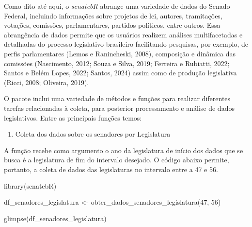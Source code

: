 \documentclass{article}
\newenvironment{Shaded}{\begin{snugshade}}{\end{snugshade}}
\newcommand{\DecValTok}[1]{\textcolor[rgb]{0.00,0.00,0.81}{#1}}
\newcommand{\FunctionTok}[1]{\textcolor[rgb]{0.00,0.00,0.00}{#1}}
\newcommand{\NormalTok}[1]{#1}
\newcommand{\OtherTok}[1]{\textcolor[rgb]{0.56,0.35,0.01}{#1}}
\providecommand{\tightlist}{%
  \setlength{\itemsep}{0pt}\setlength{\parskip}{0pt}}
\begin{document}
Como dito até aqui, o \emph{senatebR} abrange uma variedade de dados do
Senado Federal, incluindo informações sobre projetos de lei, autores,
tramitações, votações, comissões, parlamentares, partidos políticos,
entre outros. Essa abrangência de dados permite que os usuários realizem
análises multifacetadas e detalhadas do processo legislativo brasileiro
facilitando pesquisas, por exemplo, de perfis parlamentares (Lemos e
Ranincheski, 2008), composição e dinâmica das comissões (Nascimento,
2012; Souza e Silva, 2019; Ferreira e Rubiatti, 2022; Santos e Belém
Lopes, 2022; Santos, 2024) assim como de produção legislativa (Ricci,
2008; Oliveira, 2019).

O pacote inclui uma variedade de métodos e funções para realizar
diferentes tarefas relacionadas à coleta, para posterior processamento e
análise de dados legislativos. Entre as principais funções temos:

\begin{enumerate}
\def\labelenumi{\arabic{enumi}.}
\tightlist
\item
  Coleta dos dados sobre os senadores por Legislatura
\end{enumerate}

A função recebe como argumento o ano da legislatura de início dos dados
que se busca é a legislatura de fim do intervalo desejado. O código
abaixo permite, portanto, a coleta de dados das legislaturas no
intervalo entre a 47 e 56.

\begin{Shaded}
\begin{Highlighting}[]
\FunctionTok{library}\NormalTok{(senatebR)}
\end{Highlighting}
\end{Shaded}

\begin{Shaded}
\begin{Highlighting}[]
\NormalTok{df\_senadores\_legislatura }\OtherTok{\textless{}{-}} \FunctionTok{obter\_dados\_senadores\_legislatura}\NormalTok{(}\DecValTok{47}\NormalTok{, }\DecValTok{56}\NormalTok{)}

\FunctionTok{glimpse}\NormalTok{(df\_senadores\_legislatura)}
\end{Highlighting}
\end{Shaded}
\end{document}
